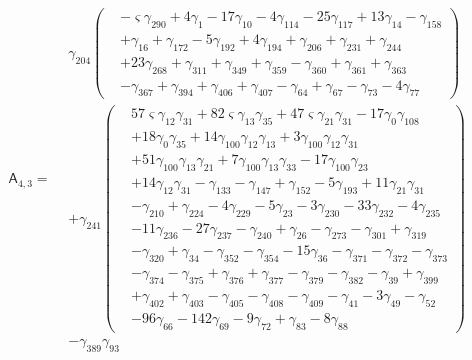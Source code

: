 \[\mathsf A_{4,3}=\begin{aligned}& \gamma_{204} \left(\begin{aligned}&- \varsigma  \gamma_{290}+ 4 \gamma_{1}- 17 \gamma_{10}- 4 \gamma_{114}- 25 \gamma_{117}+ 13 \gamma_{14}- \gamma_{158}\\&+ \gamma_{16}+ \gamma_{172}- 5 \gamma_{192}+ 4 \gamma_{194}+ \gamma_{206}+ \gamma_{231}+ \gamma_{244}\\&+ 23 \gamma_{268}+ \gamma_{311}+ \gamma_{349}+ \gamma_{359}- \gamma_{360}+ \gamma_{361}+ \gamma_{363}\\&- \gamma_{367}+ \gamma_{394}+ \gamma_{406}+ \gamma_{407}- \gamma_{64}+ \gamma_{67}- \gamma_{73}- 4 \gamma_{77}\end{aligned}\right)\\&+ \gamma_{241} \left(\begin{aligned}& 57 \varsigma  \gamma_{12} \gamma_{31}+ 82 \varsigma  \gamma_{13} \gamma_{35}+ 47 \varsigma  \gamma_{21} \gamma_{31}- 17 \gamma_{0} \gamma_{108}\\&+ 18 \gamma_{0} \gamma_{35}+ 14 \gamma_{100} \gamma_{12} \gamma_{13}+ 3 \gamma_{100} \gamma_{12} \gamma_{31}\\&+ 51 \gamma_{100} \gamma_{13} \gamma_{21}+ 7 \gamma_{100} \gamma_{13} \gamma_{33}- 17 \gamma_{100} \gamma_{23}\\&+ 14 \gamma_{12} \gamma_{31}- \gamma_{133}- \gamma_{147}+ \gamma_{152}- 5 \gamma_{193}+ 11 \gamma_{21} \gamma_{31}\\&- \gamma_{210}+ \gamma_{224}- 4 \gamma_{229}- 5 \gamma_{23}- 3 \gamma_{230}- 33 \gamma_{232}- 4 \gamma_{235}\\&- 11 \gamma_{236}- 27 \gamma_{237}- \gamma_{240}+ \gamma_{26}- \gamma_{273}- \gamma_{301}+ \gamma_{319}\\&- \gamma_{320}+ \gamma_{34}- \gamma_{352}- \gamma_{354}- 15 \gamma_{36}- \gamma_{371}- \gamma_{372}- \gamma_{373}\\&- \gamma_{374}- \gamma_{375}+ \gamma_{376}+ \gamma_{377}- \gamma_{379}- \gamma_{382}- \gamma_{39}+ \gamma_{399}\\&+ \gamma_{402}+ \gamma_{403}- \gamma_{405}- \gamma_{408}- \gamma_{409}- \gamma_{41}- 3 \gamma_{49}- \gamma_{52}\\&- 96 \gamma_{66}- 142 \gamma_{69}- 9 \gamma_{72}+ \gamma_{83}- 8 \gamma_{88}\end{aligned}\right)\\&- \gamma_{389} \gamma_{93}\end{aligned}\]

